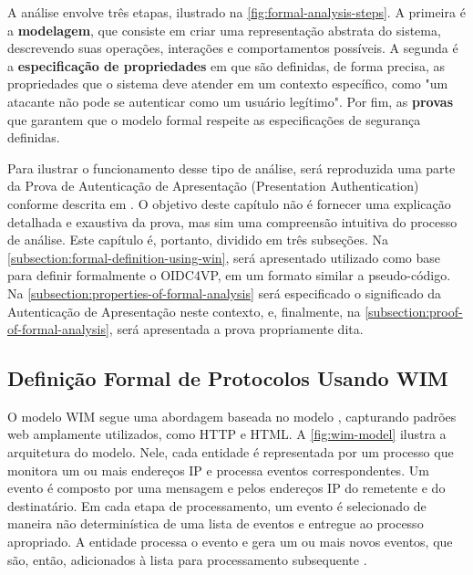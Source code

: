 A análise envolve três etapas, ilustrado na \autoref{fig:formal-analysis-steps}. A primeira é a \textbf{modelagem}, que consiste em criar uma representação abstrata do sistema, descrevendo suas operações, interações e comportamentos possíveis. A segunda é a \textbf{especificação de propriedades} em que são definidas, de forma precisa, as propriedades que o sistema deve atender em um contexto específico, como "um atacante não pode se autenticar como um usuário legítimo". Por fim, as \textbf{provas} que garantem que o modelo formal respeite as especificações de segurança definidas.



Para ilustrar o funcionamento desse tipo de análise, será reproduzida uma parte da Prova de Autenticação de Apresentação (Presentation Authentication) conforme descrita em \cite{hauck2023openid}. O objetivo deste capítulo não é fornecer uma explicação detalhada e exaustiva da prova, mas sim uma compreensão intuitiva do processo de análise. Este capítulo é, portanto, dividido em três subseções. Na \autoref{subsection:formal-definition-using-win}, será apresentado  utilizado como base para definir formalmente o \acs{OIDC4VP}, em um formato similar a pseudo-código. Na \autoref{subsection:properties-of-formal-analysis} será especificado o significado da Autenticação de Apresentação neste contexto, e, finalmente, na \autoref{subsection:proof-of-formal-analysis}, será apresentada a prova propriamente dita.

\subsection{Definição Formal de Protocolos Usando WIM}\label{subsection:formal-definition-using-win}

O modelo \acs{WIM} segue uma abordagem baseada no modelo , capturando padrões web amplamente utilizados, como HTTP e HTML. A \autoref{fig:wim-model} ilustra a arquitetura do modelo. Nele, cada entidade é representada por um processo que monitora um ou mais endereços IP e processa eventos correspondentes. Um evento é composto por uma mensagem e pelos endereços IP do remetente e do destinatário. Em cada etapa de processamento, um evento é selecionado de maneira não determinística de uma lista de eventos e entregue ao processo apropriado. A entidade processa o evento e gera um ou mais novos eventos, que são, então, adicionados à lista para processamento subsequente \cite{fett2024wim}.

